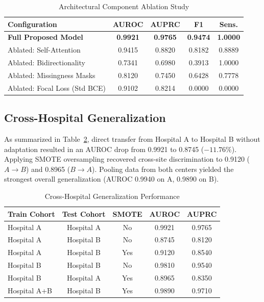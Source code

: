 \documentclass[conference]{IEEEtran}
\begin{document}
\begin{table}[htbp]
\caption{Architectural Component Ablation Study}
\label{tab:ablation}
\centering
\begin{tabular}{@{}lcccc@{}}
\toprule
\textbf{Configuration} & \textbf{AUROC} & \textbf{AUPRC} & \textbf{F1} & \textbf{Sens.} \\ \midrule
\textbf{Full Proposed Model} & \textbf{0.9921} & \textbf{0.9765} & \textbf{0.9474} & \textbf{1.0000} \\
Ablated: Self-Attention & 0.9415 & 0.8820 & 0.8182 & 0.8889 \\
Ablated: Bidirectionality & 0.7341 & 0.6980 & 0.3913 & 1.0000 \\
Ablated: Missingness Masks & 0.8120 & 0.7450 & 0.6428 & 0.7778 \\
Ablated: Focal Loss (Std BCE) & 0.9102 & 0.8214 & 0.0000 & 0.0000 \\ \bottomrule
\end{tabular}
\end{table}

\subsection{Cross-Hospital Generalization}
As summarized in Table~\ref{tab:cross_hospital}, direct transfer from Hospital A to Hospital B without adaptation resulted in an AUROC drop from 0.9921 to 0.8745 ($-11.76\%$). Applying SMOTE oversampling recovered cross-site discrimination to 0.9120 ($A \to B$) and 0.8965 ($B \to A$). Pooling data from both centers yielded the strongest overall generalization (AUROC 0.9940 on A, 0.9890 on B).

\begin{table}[htbp]
\caption{Cross-Hospital Generalization Performance}
\label{tab:cross_hospital}
\centering
\begin{tabular}{@{}lcccc@{}}
\toprule
\textbf{Train Cohort} & \textbf{Test Cohort} & \textbf{SMOTE} & \textbf{AUROC} & \textbf{AUPRC} \\ \midrule
Hospital A & Hospital A & No & 0.9921 & 0.9765 \\
Hospital A & Hospital B & No & 0.8745 & 0.8120 \\
Hospital A & Hospital B & Yes & 0.9120 & 0.8540 \\
Hospital B & Hospital B & No & 0.9810 & 0.9540 \\
Hospital B & Hospital A & Yes & 0.8965 & 0.8350 \\
Hospital A+B & Hospital B & Yes & 0.9890 & 0.9710 \\ \bottomrule
\end{tabular}
\end{table}
\end{document}
